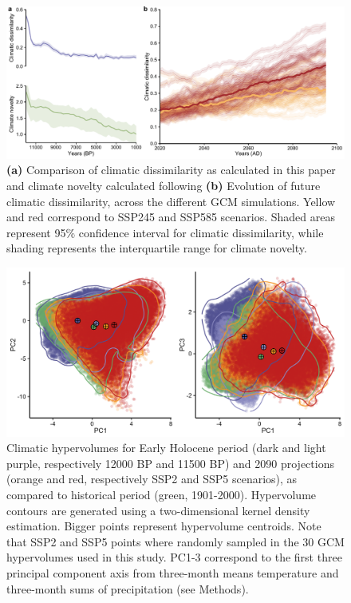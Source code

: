 \documentclass[pdflatex, sn-nature, oneside]{sn-jnl}%
\begin{document}
\begin{figure}
\hspace*{-0.75in}
\centering
\includegraphics{climatic_dissimilarity_and_distance-1.pdf}
\caption{\textbf{(a)} Comparison of climatic dissimilarity as calculated in this paper and climate novelty calculated following \cite{Burke2019} \textbf{(b)} Evolution of future climatic dissimilarity, across the different GCM simulations. Yellow and red correspond to SSP245 and SSP585 scenarios. Shaded areas represent 95\% confidence interval for climatic dissimilarity, while shading represents the interquartile range for climate novelty.}
\end{figure}

\begin{figure}
\hspace*{-0.75in}
\centering
\includegraphics{hypervolume_representation-1.png}
\caption{Climatic hypervolumes for Early Holocene period (dark and light purple, respectively 12000 BP and 11500 BP) and 2090 projections (orange and red, respectively SSP2 and SSP5 scenarios), as compared to historical period (green, 1901-2000). Hypervolume contours are generated using a two-dimensional kernel density estimation. Bigger points represent hypervolume centroids. Note that SSP2 and SSP5 points where randomly sampled in the 30 GCM hypervolumes used in this study. PC1-3 correspond to the first three principal component axis from three-month means temperature and three-month sums of precipitation (see Methods).}
\end{figure}
\end{document}
